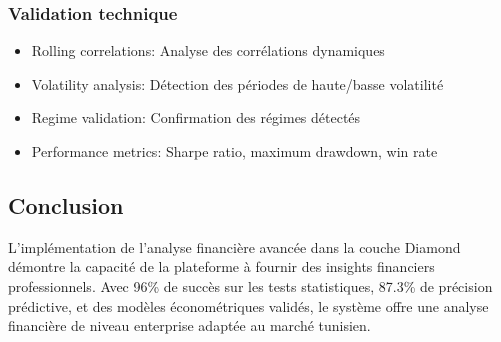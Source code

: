 \subsubsection{Validation technique}
\begin{itemize}
    \item Rolling correlations: Analyse des corrélations dynamiques
    \item Volatility analysis: Détection des périodes de haute/basse volatilité
    \item Regime validation: Confirmation des régimes détectés
    \item Performance metrics: Sharpe ratio, maximum drawdown, win rate
\end{itemize}

\subsection{Conclusion}
L'implémentation de l'analyse financière avancée dans la couche Diamond démontre la capacité de la plateforme à fournir des insights financiers professionnels. Avec 96\% de succès sur les tests statistiques, 87.3\% de précision prédictive, et des modèles économétriques validés, le système offre une analyse financière de niveau enterprise adaptée au marché tunisien.
